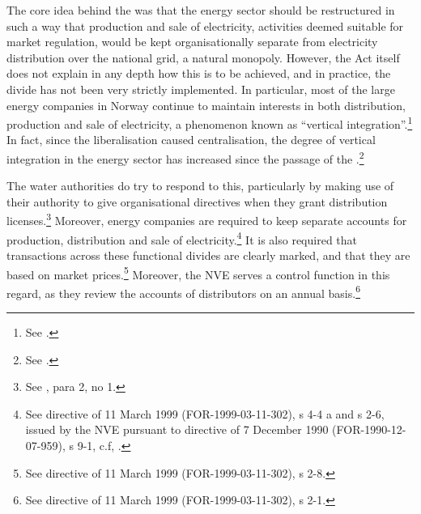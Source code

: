 
The core idea behind the \cite{ea90} was that the energy sector should be restructured in such a way that production and sale of electricity, activities deemed suitable for market regulation, would be kept organisationally separate from electricity distribution over the national grid, a natural monopoly. However, the Act itself does not explain in any depth how this is to be achieved, and in practice, the divide has not been very strictly implemented. In particular, most of the large energy companies in Norway continue to maintain interests in both distribution, production and sale of electricity, a phenomenon known as ``vertical integration''.\footnote{See \cite[580-583]{bibow03}.} In fact, since the liberalisation caused centralisation, the degree of vertical integration in the energy sector has increased since the passage of the \cite{ea90}.\footnote{See \cite[583]{bibow03}.}

The water authorities do try to respond to this, particularly by making use of their authority to give organisational directives when they grant distribution licenses.\footnote{See \cite[4-1]{ea90}, para 2, no 1.} Moreover, energy companies are required to keep separate accounts for production, distribution and sale of electricity.\footnote{See directive of 11 March 1999 (FOR-1999-03-11-302), s 4-4 a and s 2-6, issued by the NVE pursuant to directive of 7 December 1990 (FOR-1990-12-07-959), s 9-1, c.f, \cite[10-6]{ea90}.} It is also required that transactions across these functional divides are clearly marked, and that they are based on market prices.\footnote{See directive of 11 March 1999 (FOR-1999-03-11-302), s 2-8.} Moreover, the NVE serves a control function in this regard, as they review the accounts of distributors on an annual basis.\footnote{See directive of 11 March 1999 (FOR-1999-03-11-302), s 2-1.}


